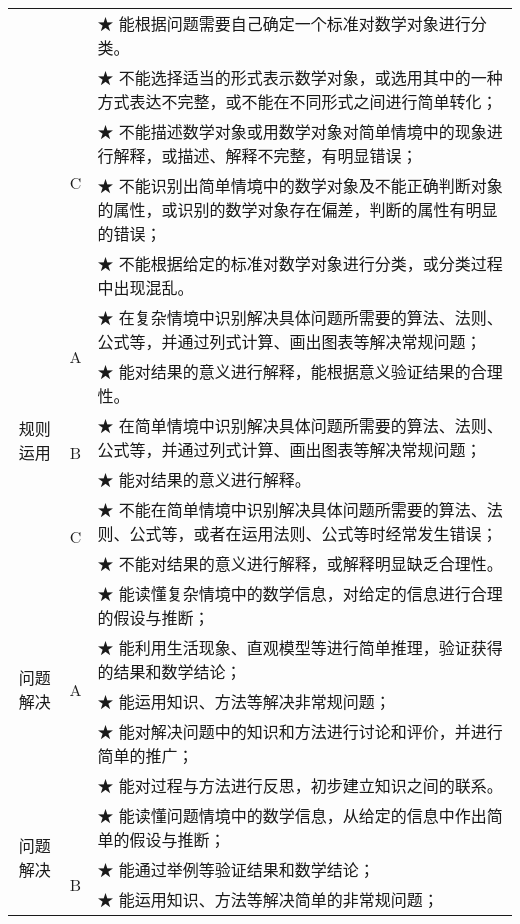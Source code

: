 \begin{itshape}
\begin{longtable}{|c|c|p{12cm}|}
   & &  ★ 能根据问题需要自己确定一个标准对数学对象进行分类。 \\    
\cline{2-3}      

   &   \multirow{4}{*}{C}  &  ★ 不能选择适当的形式表示数学对象，或选用其中的一种方式表达不完整，或不能在不同形式之间进行简单转化；\\  
   & &  ★ 不能描述数学对象或用数学对象对简单情境中的现象进行解释，或描述、解释不完整，有明显错误；\\  
   & &  ★ 不能识别出简单情境中的数学对象及不能正确判断对象的属性，或识别的数学对象存在偏差，判断的属性有明显的错误； \\   
   & &  ★ 不能根据给定的标准对数学对象进行分类，或分类过程中出现混乱。 \\   
\hline
   
   \multirow{6}{*}{规则运用}  & \multirow{2}{*}{A}  & ★   在复杂情境中识别解决具体问题所需要的算法、法则、公式等，并通过列式计算、画出图表等解决常规问题； \\    
   & &  ★ 能对结果的意义进行解释，能根据意义验证结果的合理性。 \\   
\cline{2-3}      

   &   \multirow{2}{*}{B}  &  ★ 在简单情境中识别解决具体问题所需要的算法、法则、公式等，并通过列式计算、画出图表等解决常规问题；\\  
   & &  ★   能对结果的意义进行解释。\\   
\cline{2-3}      

   &   \multirow{2}{*}{C}  &  ★ 不能在简单情境中识别解决具体问题所需要的算法、法则、公式等，或者在运用法则、公式等时经常发生错误；\\  
   & &  ★ 不能对结果的意义进行解释，或解释明显缺乏合理性。\\  
\hline
   
   \multirow{5}{*}{问题解决}  & \multirow{5}{*}{A}  & ★ 能读懂复杂情境中的数学信息，对给定的信息进行合理的假设与推断； \\    
   & &  ★ 能利用生活现象、直观模型等进行简单推理，验证获得的结果和数学结论； \\  
   & &  ★ 能运用知识、方法等解决非常规问题；\\    
   & &  ★ 能对解决问题中的知识和方法进行讨论和评价，并进行简单的推广；\\  
   & &  ★ 能对过程与方法进行反思，初步建立知识之间的联系。\\    
\cline{2-3}      

   \multirow{8}{*}{问题解决} &  &  ★ 能读懂问题情境中的数学信息，从给定的信息中作出简单的假设与推断；\\  
   & \multirow{3}{*}{B} &  ★   能通过举例等验证结果和数学结论；\\  
   & &  ★ 能运用知识、方法等解决简单的非常规问题； \\   
   

\end{longtable}
\end{itshape}
